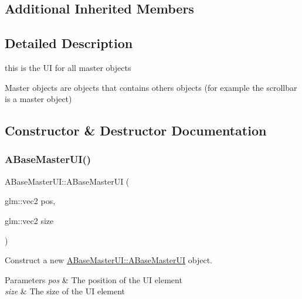 \subsection*{Additional Inherited Members}


\subsection{Detailed Description}
this is the UI for all master objects 

Master objects are objects that contains others objects (for example the scrollbar is a master object) 

\subsection{Constructor \& Destructor Documentation}
\mbox{\label{class_a_base_master_u_i_a311ce7af9ba882f3a274f6887c2196dc}} 
\subsubsection{\texorpdfstring{A\+Base\+Master\+U\+I()}{ABaseMasterUI()}\hspace{0.1cm}{\footnotesize\ttfamily [1/2]}}
{\footnotesize\ttfamily A\+Base\+Master\+U\+I\+::\+A\+Base\+Master\+UI (\begin{DoxyParamCaption}\item[{glm\+::vec2}]{pos,  }\item[{glm\+::vec2}]{size }\end{DoxyParamCaption})}



Construct a new \hyperlink{class_a_base_master_u_i_a311ce7af9ba882f3a274f6887c2196dc}{A\+Base\+Master\+U\+I\+::\+A\+Base\+Master\+UI} object. 


\begin{DoxyParams}{Parameters}
{\em pos} & The position of the UI element \\
\hline
{\em size} & The size of the UI element \\
\hline
\end{DoxyParams}
\mbox{\label{class_a_base_master_u_i_aca816b5bc0624de287a3d386215a4c71}} 
